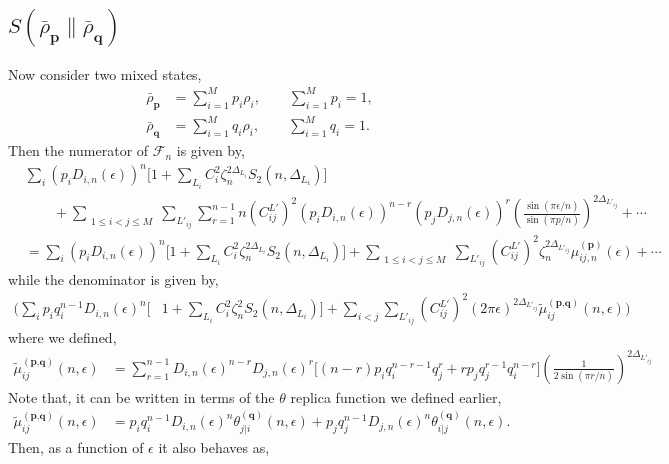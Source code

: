 \documentclass[11pt]{article}
\newcommand{\ep}{\epsilon}
\newcommand{\nn}{\nonumber}
\newcommand{\lb}{\left(}
\newcommand{\rb}{\right)}
\begin{document}
\subsection{\texorpdfstring{$S(\bar{\rho}_\textbf{p}\| \bar{\rho}_\textbf{q})$}{S rho bar p wrt rho bar q}}
Now consider two mixed states,
\begin{align}
    \bar{\rho}_\textbf{p} &= \sum_{i=1}^M p_i\rho_i, \qquad \sum_{i=1}^M p_i = 1, \\
    \bar{\rho}_\textbf{q} &= \sum_{i=1}^Mq_i \rho_i,\qquad  \sum_{i=1}^Mq_i = 1.
\end{align}
Then the numerator of $\mathcal{F}_n$ is given by,
\begin{align}
    &\sum_i  \lb p_iD_{i,n}(\ep)\rb^n \big[  1+ \sum_{L_i}C_i^2 \zeta_n^{2\Delta_{L_i}} S_2(n,\Delta_{L_i})\big] \nn \\
    &\qquad + \displaystyle\sum_{\substack{1\leq i<j\leq M}}\sum_{L'_{ij}}\sum_{r=1}^{n-1} n\lb C_{ij}^{L'}\rb^2\lb p_iD_{i,n}(\ep)\rb^{n-r}\lb p_jD_{j,n}(\ep)\rb ^r \lb\frac{\sin (\pi \ep/n)}{\sin (\pi p/n)}\rb^{2\Delta_{L'_{ij}}}+  \cdots  \\
    &=\sum_i  \lb p_iD_{i,n}(\ep)\rb^n \big[  1+ \sum_{L_i}C_i^2 \zeta_n^{2\Delta_{L_i}} S_2(n,\Delta_{L_i})\big] + \displaystyle\sum_{\substack{1\leq i<j\leq M}}\sum_{L'_{ij}} \lb C_{ij}^{L'}\rb^2 \zeta_n^{2\Delta_{L'_{ij}}} \mu_{ij,n}^{(\textbf{p})}(\ep) +\cdots
\end{align}
while the denominator is given by,
\begin{align}
    \Bigg(  \sum_i p_i q_i^{n-1}D_{i,n}(\ep)^n\big[&1+ \sum_{L_i}C_i^2 \zeta_n^2S_2(n,\Delta_{L_i})\big] + \sum_{i<j}\sum_{L'_{ij}}\lb C_{ij}^{L'}\rb^2 (2\pi\ep)^{2\Delta_{L'_{ij}}}\tilde{\mu}_{ij}^{(\textbf{p,q})}(n,\ep)\Bigg)
\end{align}
where we defined,
\begin{align}
    \tilde{\mu}_{ij}^{(\textbf{p,q})}(n,\ep) &= \sum_{r=1}^{n-1} D_{i,n}(\ep)^{n-r}D_{j,n}(\ep)^r\big[(n-r)p_iq_i^{n-r-1}q_j^r + rp_jq_j^{r-1}q_i^{n-r}\big]\lb\frac{1}{2\sin (\pi r/n)}\rb^{2\Delta_{L'_{ij}}}
\end{align}
Note that, it can be written in terms of the $\theta$ replica function we defined earlier,
\begin{align}
    \tilde{\mu}_{ij}^{(\textbf{p,q})}(n,\ep) &= p_i q_i^{n-1}D_{i,n}(\ep)^n\theta_{j|i}^{(\textbf{q})}(n,\ep) + p_j q_j^{n-1}D_{j,n}(\ep)^n\theta_{i|j}^{(\textbf{q})} (n,\ep).
\end{align}
Then, as a function of $\ep$ it also behaves as, 
\end{document}
